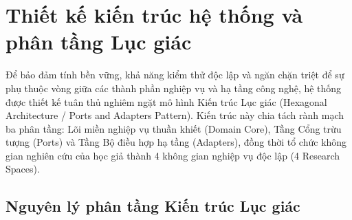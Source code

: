 \section{Thiết kế kiến trúc hệ thống và phân tầng Lục giác}
\label{sec:thiet_ke_kien_truc}

Để bảo đảm tính bền vững, khả năng kiểm thử độc lập và ngăn chặn triệt để sự phụ thuộc vòng giữa các thành phần nghiệp vụ và hạ tầng công nghệ, hệ thống \VS được thiết kế tuân thủ nghiêm ngặt mô hình Kiến trúc Lục giác (Hexagonal Architecture / Ports and Adapters Pattern). Kiến trúc này chia tách rành mạch ba phân tầng: Lõi miền nghiệp vụ thuần khiết (Domain Core), Tầng Cổng trừu tượng (Ports) và Tầng Bộ điều hợp hạ tầng (Adapters), đồng thời tổ chức không gian nghiên cứu của học giả thành 4 không gian nghiệp vụ độc lập (4 Research Spaces).

\subsection{Nguyên lý phân tầng Kiến trúc Lục giác}
\label{subsec:nguyen_ly_luc_giac}

